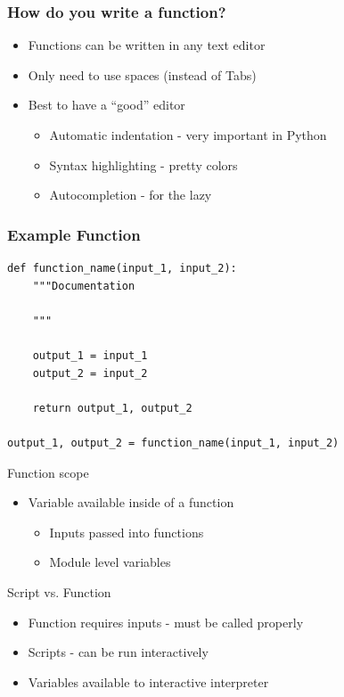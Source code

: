 \documentclass[11pt,professionalfonts]{beamer}
\begin{document}
\begin{frame}\frametitle{How do you write a function?}
    \begin{itemize}
        \item Functions can be written in any text editor
        \item Only need to use spaces (instead of Tabs)
        \item Best to have a ``good'' editor
            \begin{itemize}
                \item Automatic indentation - very important in Python
                \item Syntax highlighting - pretty colors
                \item Autocompletion - for the lazy
            \end{itemize}
    \end{itemize}
\end{frame}

\begin{frame}[fragile]\frametitle{Example Function}
\begin{verbatim}
def function_name(input_1, input_2):
    """Documentation

    """

    output_1 = input_1
    output_2 = input_2

    return output_1, output_2

output_1, output_2 = function_name(input_1, input_2)
\end{verbatim}

\end{frame}

\begin{frame}{Function scope}
    \begin{itemize}
        \item Variable available inside of a function
            \begin{itemize}
                \item Inputs passed into functions
                \item Module level variables
            \end{itemize}
    \end{itemize}
\end{frame}

\begin{frame}{Script vs. Function}
    \begin{itemize}
        \item Function requires inputs - must be called properly
        \item Scripts - can be run interactively
        \item Variables available to interactive interpreter
    \end{itemize}
\end{frame}
\end{document}
